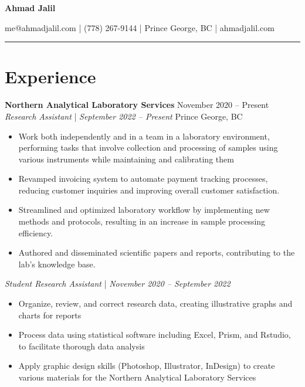 \documentclass[11pt]{article}
\begin{document}
{\fontsize{26}{32}\selectfont \textbf{Ahmad Jalil}} 

\vspace{6pt}

{\fontsize{14}{16}\selectfont me@ahmadjalil.com | (778) 267-9144 | Prince George, BC | ahmadjalil.com} 

\vspace{-4pt}

\noindent\rule{\textwidth}{0.4pt}

\vspace{-4pt}

\section{Experience}

\vspace{4pt}

\noindent\textbf{Northern Analytical Laboratory Services} \hfill November 2020 – Present \\
\textit{Research Assistant} | \textit{September 2022 – Present} \hfill Prince George, BC
\begin{itemize}[leftmargin=*, topsep=2pt, itemsep=1pt, parsep=0pt]
\item Work both independently and in a team in a laboratory environment, performing tasks that involve collection and processing of samples using various instruments while maintaining and calibrating them
\item Revamped invoicing system to automate payment tracking processes, reducing customer inquiries and improving overall customer satisfaction.
\item Streamlined and optimized laboratory workflow by implementing new methods and protocols, resulting in an increase in sample processing efficiency.
\item Authored and disseminated scientific papers and reports, contributing to the lab's knowledge base.
\end{itemize}

\vspace{1pt}
\textit{Student Research Assistant} | \textit{November 2020 – September 2022}
\begin{itemize}[leftmargin=*, topsep=2pt, itemsep=1pt, parsep=0pt]
\item Organize, review, and correct research data, creating illustrative graphs and charts for reports
\item Process data using statistical software including Excel, Prism, and Rstudio, to facilitate thorough data analysis
\item Apply graphic design skills (Photoshop, Illustrator, InDesign) to create various materials for the Northern Analytical Laboratory Services
\end{itemize}
\end{document}
